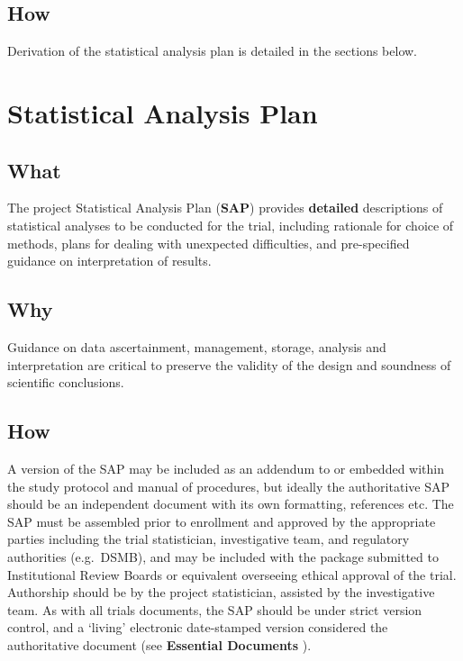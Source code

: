 \documentclass[]{book}
\begin{document}
\subsection{How}\label{how-2}

Derivation of the statistical analysis plan is detailed in the sections
below.

\hypertarget{statistical-analysis-plan}{\section{Statistical Analysis
Plan}\label{statistical-analysis-plan}}

\subsection{What}\label{what-3}

The project Statistical Analysis Plan (\textbf{SAP}) provides
\textbf{detailed} descriptions of statistical analyses to be conducted
for the trial, including rationale for choice of methods, plans for
dealing with unexpected difficulties, and pre-specified guidance on
interpretation of results.

\subsection{Why}\label{why-3}

Guidance on data ascertainment, management, storage, analysis and
interpretation are critical to preserve the validity of the design and
soundness of scientific conclusions.

\subsection{How}\label{how-3}

A version of the SAP may be included as an addendum to or embedded
within the study protocol and manual of procedures, but ideally the
authoritative SAP should be an independent document with its own
formatting, references etc. The SAP must be assembled prior to
enrollment and approved by the appropriate parties including the trial
statistician, investigative team, and regulatory authorities
(e.g.~DSMB), and may be included with the package submitted to
Institutional Review Boards or equivalent overseeing ethical approval of
the trial. Authorship should be by the project statistician, assisted by
the investigative team. As with all trials documents, the SAP should be
under strict version control, and a `living' electronic date-stamped
version considered the authoritative document (see \textbf{Essential
Documents} ).
\end{document}

